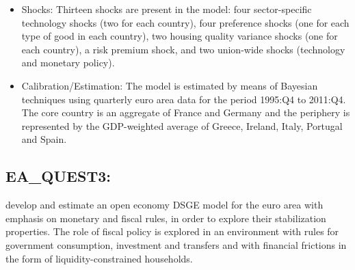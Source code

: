 \documentclass[11pt,a4paper]{article}
\begin{document}
\begin{itemize}
		\item	Shocks: Thirteen shocks are present in the model: four sector-specific technology shocks (two for each country), four preference shocks (one for each type of good in each country), two housing quality variance shocks (one for each country), a risk premium shock, and two union-wide shocks (technology and monetary policy).
		\item Calibration/Estimation: The model is estimated by means of Bayesian techniques using quarterly euro area data for the period 1995:Q4 to 2011:Q4. The core country is an aggregate of France and Germany and the periphery is represented by the GDP-weighted average of Greece, Ireland, Italy, Portugal and Spain.
	\end{itemize}
	
	\subsection{EA\_QUEST3: \cite{RattoRoegerVeld2009}}
	\label{EAQUEST3}
	\cite{RattoRoegerVeld2009} develop and estimate an open economy DSGE model for the euro area with emphasis on monetary and fiscal rules, in order to explore their stabilization properties. The role of fiscal policy is explored in an environment with rules for government consumption, investment and transfers and with financial frictions in the form of liquidity-constrained households.
\end{document}
